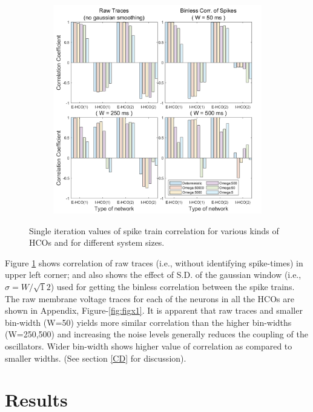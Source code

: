 \documentclass[
]{article}
\begin{document}
\begin{figure}
  \centering
  \begin{subfigure}[b]{0.75\textwidth}
      \includegraphics[width=\textwidth]{figs/F6_HCO_corr_single_run.png}
  \end{subfigure}
  \vspace{-0.25cm}
  \caption{Single iteration values of spike train correlation for various kinds of HCOs and for different system sizes.} \label{fig:fig6}
\end{figure}

Figure \ref{fig:fig6} shows correlation of raw traces (i.e., without identifying spike-times) in upper left corner; and also shows the effect of S.D. of the gaussian window (i.e., \(\sigma=W/\sqrt12\)) used for getting the binless correlation between the spike trains. The raw membrane voltage traces for each of the neurons in all the HCOs are shown in Appendix, Figure-\ref{fig:figx1}. It is apparent that raw traces and smaller bin-width (W=50) yields more similar correlation than the higher bin-widths (W=250,500) and increasing the noise levels generally reduces the coupling of the oscillators. Wider bin-width shows higher value of correlation as compared to smaller widths. (See section \ref{CD} for discussion).

\hypertarget{results}{%
\section{Results}\label{results}}
\end{document}
